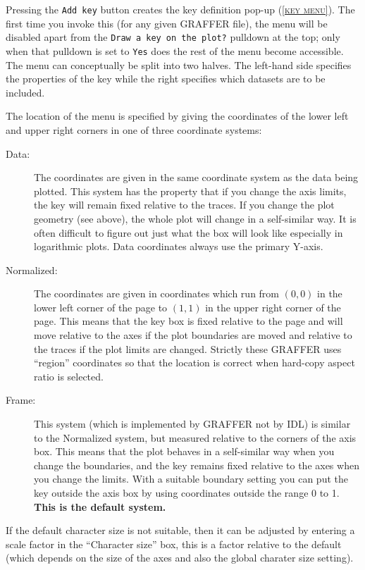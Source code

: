 \documentclass[11pt,twoside,english]{article}
\begin{document}
Pressing the \texttt{Add key} button creates the key definition pop-up
(\textsc{\autoref{key menu}}). The first time you invoke this (for any
given GRAFFER file), the menu will be disabled apart from the
\texttt{Draw a key on the plot?} pulldown at the top; only when that
pulldown is set to \texttt{Yes} does the rest of the menu become
accessible. The menu can conceptually be split into two halves. The
left-hand side specifies the properties of the key while the right
specifies which datasets are to be included.

The location of the menu is specified by giving the coordinates of the
lower left and upper right corners in one of three coordinate
systems\label{coordsys}:

\begin{description}
\item [Data:]The coordinates are given in the same coordinate system as
  the data being plotted. This system has the property that if you
  change the axis limits, the key will remain fixed relative to the
  traces.  If you change the plot geometry (see above), the whole plot
  will change in a self-similar way. It is often difficult to figure
  out just what the box will look like especially in logarithmic
  plots. Data coordinates always use the primary Y-axis.
\item [Normalized:]The coordinates are given in coordinates which run
  from $(0,0)$ in the lower left corner of the page to $(1,1)$ in the
  upper right corner of the page. This means that the key box is fixed
  relative to the page and will move relative to the axes if the plot
  boundaries are moved and relative to the traces if the plot limits
  are changed. Strictly these GRAFFER uses ``region'' coordinates so
  that the location is correct when hard-copy aspect ratio is selected.
\item [Frame:]This system (which is implemented by GRAFFER not by IDL)
  is similar to the Normalized system, but measured relative to the
  corners of the axis box. This means that the plot behaves in a
  self-similar way when you change the boundaries, and the key remains
  fixed relative to the axes when you change the limits. With a
  suitable boundary setting you can put the key outside the axis box by
  using coordinates outside the range 0 to 1. \textbf{This is the
    default system.}
\end{description}

If the default character size is not suitable, then it can be adjusted
by entering a scale factor in the ``Character size'' box, this is a
factor relative to the default (which depends on the size of the axes
and also the global charater size setting).
\end{document}
